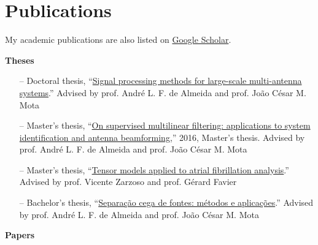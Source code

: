 \section{Publications}

My academic publications are also listed on \href{https://scholar.google.com.br/citations?user=STk6opQAAAAJ}{Google Scholar}.

{\bf Theses}\\

\begin{itemize}
	\item[--] Doctoral thesis, ``\href{http://repositorio.ufc.br/bitstream/riufc/47501/3/2019_tese_lnribeiro.pdf}{Signal processing methods for large-scale multi-antenna systems}.'' Advised by prof. Andr\'e L. F. de Almeida and prof. Jo\~ao C\'esar M. Mota
	\item[--] Master's thesis, ``\href{http://www.repositorio.ufc.br/bitstream/riufc/16516/1/2016_dis_lnribeiro.pdf}{On supervised multilinear filtering: applications to system identification and antenna beamforming},'' 2016, Master's thesis. Advised by prof. Andr\'e L. F. de Almeida and prof. Jo\~ao C\'esar M. Mota
	\item[--] Master's thesis, ``\href{https://github.com/lnribeiro/lnribeiro.github.io/blob/master/assets/pdf/rapport.pdf}{Tensor models applied to atrial fibrillation analysis}.'' Advised by prof. Vicente Zarzoso and prof. G\'erard Favier
	\item[--] Bachelor's thesis, ``\href{https://github.com/lnribeiro/lnribeiro.github.io/blob/master/assets/pdf/monografia.pdf}{Separação cega de fontes: métodos e aplicações}.'' Advised by prof. Andr\'e L. F. de Almeida and prof. Jo\~ao C\'esar M. Mota
\end{itemize}

{\bf Papers}\\

